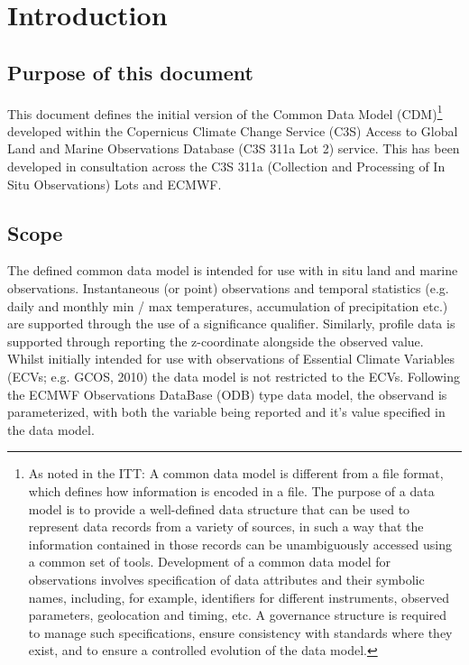\documentclass[a4paper]{article}
\begin{document}
\newpage
\tableofcontents
\newpage
\listoftables
\newpage


\section {Introduction}

\subsection {Purpose of this document}
This document defines the initial version of the Common Data Model (CDM)\footnote{As noted in the ITT: A common data model is different from a file format, which defines how information is encoded in a file. The purpose of a data model is to provide a well-defined data structure that can be used to represent data records from a variety of sources, in such a way that the information contained in those records can be unambiguously accessed using a common set of tools. Development of a common data model for observations involves specification of data attributes and their symbolic names, including, for example, identifiers for different instruments, observed parameters, geolocation and timing, etc. A governance structure is required to manage such specifications, ensure consistency with standards where they exist, and to ensure a controlled evolution of the data model.} developed within the Copernicus Climate Change Service (C3S) Access to Global Land and Marine Observations Database (C3S 311a Lot 2) service. This has been developed in consultation across the C3S 311a (Collection and Processing of In Situ Observations) Lots and ECMWF.

\subsection {Scope}
The defined common data model is intended for use with in situ land and marine observations. Instantaneous (or point) observations and temporal statistics (e.g. daily and monthly min / max temperatures, accumulation of precipitation etc.)  are supported through the use of a significance qualifier. Similarly, profile data is supported through reporting the z-coordinate alongside the observed value.\\

Whilst initially intended for use with observations of Essential Climate Variables (ECVs; e.g. GCOS, 2010) the data model is not restricted to the ECVs. Following the ECMWF Observations DataBase (ODB) type data model, the observand is parameterized, with both the variable being reported and it's value specified in the data model.\\
\end{document}

